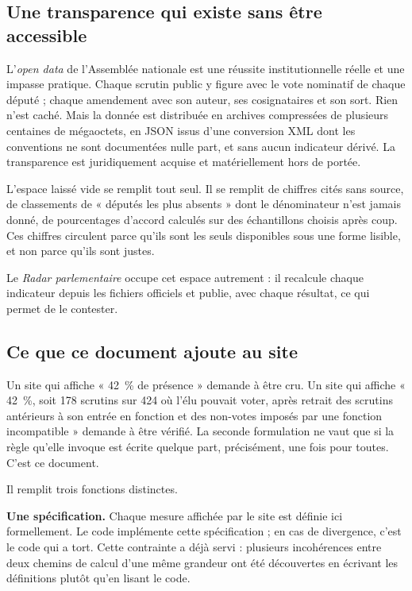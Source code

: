 \documentclass[11pt,a4paper]{article}
\begin{document}
\subsection{Une transparence qui existe sans être accessible}

L'\emph{open data} de l'Assemblée nationale est une réussite institutionnelle
réelle et une impasse pratique. Chaque scrutin public y figure avec le vote
nominatif de chaque député ; chaque amendement avec son auteur, ses
cosignataires et son sort. Rien n'est caché. Mais la donnée est distribuée en
archives compressées de plusieurs centaines de mégaoctets, en JSON issus d'une
conversion XML dont les conventions ne sont documentées nulle part, et sans
aucun indicateur dérivé. La transparence est juridiquement acquise et
matériellement hors de portée.

L'espace laissé vide se remplit tout seul. Il se remplit de chiffres cités
sans source, de classements de « députés les plus absents » dont le
dénominateur n'est jamais donné, de pourcentages d'accord calculés sur des
échantillons choisis après coup. Ces chiffres circulent parce qu'ils sont les
seuls disponibles sous une forme lisible, et non parce qu'ils sont justes.

Le \emph{Radar parlementaire} occupe cet espace autrement : il recalcule
chaque indicateur depuis les fichiers officiels et publie, avec chaque
résultat, ce qui permet de le contester.

\subsection{Ce que ce document ajoute au site}

Un site qui affiche « 42~\% de présence » demande à être cru. Un site qui
affiche « 42~\%, soit 178 scrutins sur 424 où l'élu pouvait voter, après
retrait des scrutins antérieurs à son entrée en fonction et des non-votes
imposés par une fonction incompatible » demande à être vérifié. La seconde
formulation ne vaut que si la règle qu'elle invoque est écrite quelque part,
précisément, une fois pour toutes. C'est ce document.

Il remplit trois fonctions distinctes.

\textbf{Une spécification.} Chaque mesure affichée par le site est définie ici
formellement. Le code implémente cette spécification ; en cas de divergence,
c'est le code qui a tort. Cette contrainte a déjà servi : plusieurs
incohérences entre deux chemins de calcul d'une même grandeur ont été
découvertes en écrivant les définitions plutôt qu'en lisant le code.
\end{document}
